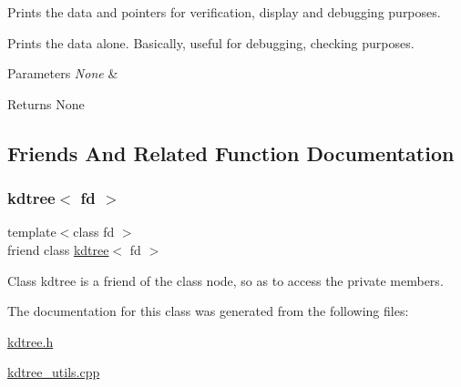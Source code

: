 Prints the data and pointers for verification, display and debugging purposes. 

Prints the data alone. Basically, useful for debugging, checking purposes.


\begin{DoxyParams}{Parameters}
{\em None} & \\
\hline
\end{DoxyParams}
\begin{DoxyReturn}{Returns}
None 
\end{DoxyReturn}


\subsection{Friends And Related Function Documentation}
\mbox{\label{classnode_a01262b43303642d58dcf997f191757c8}} 
\subsubsection{\texorpdfstring{kdtree$<$ fd $>$}{kdtree< fd >}}
{\footnotesize\ttfamily template$<$class fd $>$ \\
friend class \hyperlink{classkdtree}{kdtree}$<$ fd $>$\hspace{0.3cm}{\ttfamily [friend]}}

Class \textquotesingle{}kdtree\textquotesingle{} is a friend of the class \textquotesingle{}node\textquotesingle{}, so as to access the private members. 

The documentation for this class was generated from the following files\+:\begin{DoxyCompactItemize}
\item 
\hyperlink{kdtree_8h}{kdtree.\+h}\item 
\hyperlink{kdtree__utils_8cpp}{kdtree\+\_\+utils.\+cpp}\end{DoxyCompactItemize}
